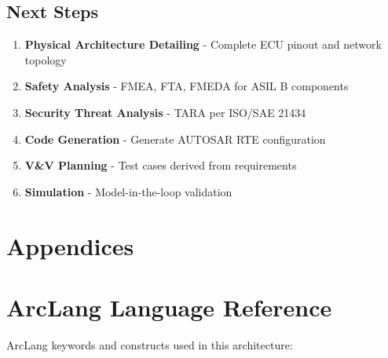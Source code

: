 \documentclass[11pt,a4paper]{article}
\begin{document}
\subsection{Next Steps}

\begin{enumerate}[leftmargin=*]
    \item \textbf{Physical Architecture Detailing} - Complete ECU pinout and network topology
    \item \textbf{Safety Analysis} - FMEA, FTA, FMEDA for ASIL B components
    \item \textbf{Security Threat Analysis} - TARA per ISO/SAE 21434
    \item \textbf{Code Generation} - Generate AUTOSAR RTE configuration
    \item \textbf{V\&V Planning} - Test cases derived from requirements
    \item \textbf{Simulation} - Model-in-the-loop validation
\end{enumerate}

\section*{Appendices}

\appendix

\section{ArcLang Language Reference}
\label{app:arclang_ref}

ArcLang keywords and constructs used in this architecture:
\end{document}
